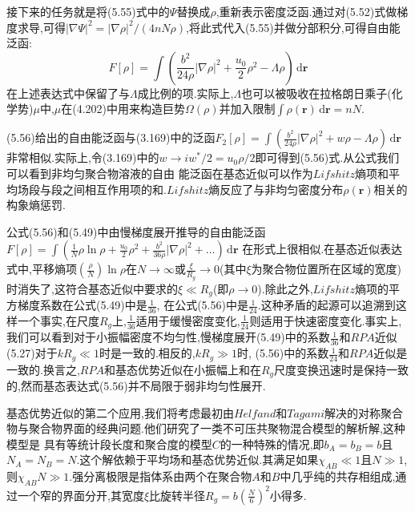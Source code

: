 接下来的任务就是将(5.55)式中的$\Psi$替换成$\rho$,重新表示密度泛函.通过对(5.52)式做梯度求导,可得$|\nabla\Psi|^2 = |\nabla\rho|^2/(4nN\rho)$,将此式代入(5.55)并做分部积分,可得自由能泛函:
\begin{equation}
F[\rho] = \int (\frac{b^2}{24\rho}|\nabla\rho|^2+\frac{u_0}{2}\rho^2-\Lambda\rho)\,\mathrm{d}\mathbf{r}
\end{equation}
在上述表达式中保留了与$\Lambda$成比例的项.实际上,$\Lambda$也可以被吸收在拉格朗日乘子(化学势)$\mu$中,$\mu$在(4.202)中用来构造巨势$\Omega(\rho)$并加入限制$\int \rho(\mathbf{r})\,\mathrm{d}\mathbf{r}=nN$.

(5.56)给出的自由能泛函与(3.169)中的泛函$F_2[\rho] = \int (\frac{b^2}{24\rho}|\nabla\rho |^2+w\rho-\Lambda\rho )\,\mathrm{d}\mathbf{r}$非常相似.实际上,令(3.169)中的$w\rightarrow iw^*/2 = u_0\rho/2$即可得到(5.56)式.从公式我们可以看到非均匀聚合物溶液的自由
能泛函在基态近似可以作为$Lifshitz$熵项和平均场段与段之间相互作用项的和.$Lifshitz$熵反应了与非均匀密度分布$\rho (\mathbf{r})$相关的构象熵惩罚.

公式(5.56)和(5.49)中由慢梯度展开推导的自由能泛函$F[\rho] = \int (\frac{1}{N}\rho\ln\rho+\frac{u_0}{2}\rho^2+\frac{b^2}{36\rho}|\nabla\rho|^2+\dots)\,\mathrm{d}\mathbf{r}$ 在形式上很相似.在基态近似表达式中,平移熵项$(\frac{\rho}{N})\ln \rho$在$N\rightarrow\infty$或$\frac{\xi}{R_g}\rightarrow0$(其中$\xi $为聚合物位置所在区域的宽度)时消失了,这符合基态近似中要求的$\xi \ll R_g$(即$\rho\rightarrow0$).除此之外,$Lifshitz$熵项的平方梯度系数在公式(5.49)中是$\frac{1}{36}$, 在公式(5.56)中是$\frac{1}{24}$.这种矛盾的起源可以追溯到这样一个事实,在尺度$R_g$上,$\frac{1}{36}$适用于缓慢密度变化,$\frac{1}{24}$则适用于快速密度变化.事实上,我们可以看到对于小振幅密度不均匀性,慢梯度展开(5.49)中的系数$\frac{1}{36}$和$RPA$近似(5.27)对于$kR_g\ll1$时是一致的.相反的,$kR_g \gg 1$时,
(5.56)中的系数$\frac{1}{24}$和$RPA$近似是一致的.换言之,$RPA$和基态优势近似在小振幅上和在$R_g$尺度变换迅速时是保持一致的,然而基态表达式(5.56)并不局限于弱非均匀性展开.

基态优势近似的第二个应用,我们将考虑最初由$Helfand$和$Tagami$解决的对称聚合物与聚合物界面的经典问题.他们研究了一类不可压共聚物混合模型的解析解,这种模型是 具有等统计段长度和聚合度的模型$C$的一种特殊的情况,即$b_A=b_B=b$且$N_A=N_B=N$.这个解依赖于平均场和基态优势近似.其满足如果$\chi_{AB}\ll1$且$N\gg1$,则$\chi_{AB}N\gg1$.强分离极限是指体系由两个在聚合物$A$和$B$中几乎纯的共存相组成,通过一个窄的界面分开,其宽度$\xi$比旋转半径$R_g=b(\frac{N}{6})^2$小得多.

